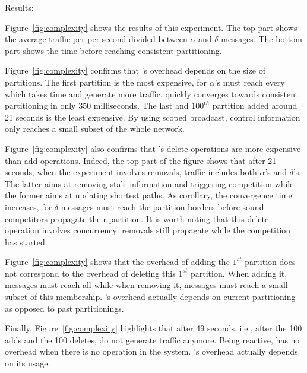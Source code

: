 \begin{asparadesc}
\item [Results:]

Figure~\ref{fig:complexity} shows the results of this experiment. The
top part shows the average traffic per \process per second divided
between $\alpha$ and $\delta$ messages. The bottom part shows the time
before reaching consistent partitioning.

\noindent Figure~\ref{fig:complexity} confirms that \NAME's overhead
depends on the size of partitions. The first partition is the most
expensive, for $\alpha$'s must reach every \process which takes time
and generate more traffic.  \NAME quickly converges towards consistent
partitioning in only 350 milliseconds. The last and $100^{th}$
partition added around 21 seconds is the least expensive. By using
scoped broadcast, control information only reaches a small subset of
the whole network.

\noindent Figure~\ref{fig:complexity} also confirms that \NAME's
delete operations are more expensive than add operations. Indeed, the
top part of the figure shows that after 21 seconds, when the
experiment involves removals, traffic includes both $\alpha$'s and
$\delta$'s. The latter aims at removing stale information and
triggering competition while the former aims at updating shortest
paths. As corollary, the convergence time increases, for $\delta$
messages must reach the partition borders before sound competitors
propagate their partition. It is worth noting that this delete
operation involves concurrency: removals still propagate while
the competition has started. %



\noindent Figure~\ref{fig:complexity} shows that the overhead of
adding the $1^{st}$ partition does not correspond to the overhead of
deleting this $1^{st}$ partition. When adding it, messages must reach
all \processes while when removing it, messages must reach a small
subset of this membership.  \NAME's overhead actually depends on
current partitioning as opposed to past partitionings.

\noindent Finally, Figure~\ref{fig:complexity} highlights that after
49 seconds, i.e., after the 100 adds and the 100 deletes, \processes
do not generate traffic anymore. Being reactive, \NAME has no overhead
when there is no operation in the system. \NAME's overhead actually
depends on its usage.

\end{asparadesc}

